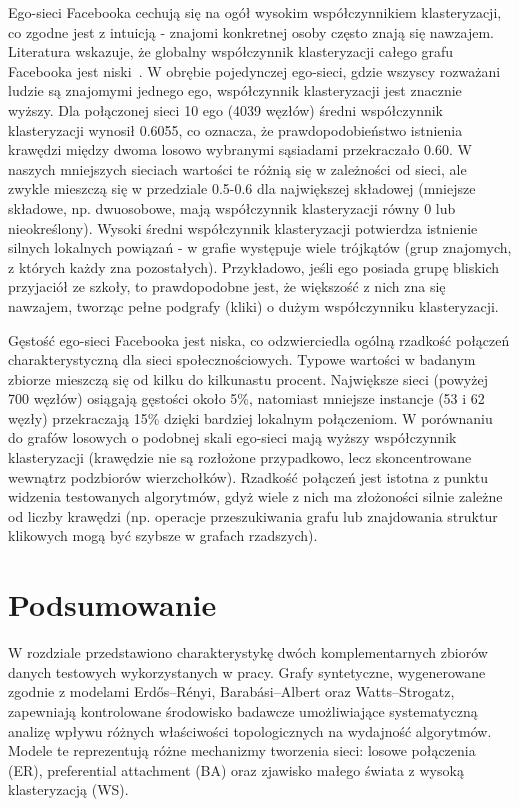 Ego-sieci Facebooka cechują się na ogół wysokim współczynnikiem klasteryzacji, co zgodne jest z intuicją - znajomi konkretnej osoby często znają się nawzajem. Literatura wskazuje, że globalny współczynnik klasteryzacji całego grafu Facebooka jest niski~\cite{Ugander2011}. W obrębie pojedynczej ego-sieci, gdzie wszyscy rozważani ludzie są znajomymi jednego ego, współczynnik klasteryzacji jest znacznie wyższy. Dla połączonej sieci 10 ego (4039 węzłów) średni współczynnik klasteryzacji wynosił 0.6055, co oznacza, że prawdopodobieństwo istnienia krawędzi między dwoma losowo wybranymi sąsiadami przekraczało 0.60. W naszych mniejszych sieciach wartości te różnią się w zależności od sieci, ale zwykle mieszczą się w przedziale 0.5-0.6 dla największej składowej (mniejsze składowe, np. dwuosobowe, mają współczynnik klasteryzacji równy 0 lub nieokreślony). Wysoki średni współczynnik klasteryzacji potwierdza istnienie silnych lokalnych powiązań - w grafie występuje wiele trójkątów (grup znajomych, z których każdy zna pozostałych). Przykładowo, jeśli ego posiada grupę bliskich przyjaciół ze szkoły, to prawdopodobne jest, że większość z nich zna się nawzajem, tworząc pełne podgrafy (kliki) o dużym współczynniku klasteryzacji.

Gęstość ego-sieci Facebooka jest niska, co odzwierciedla ogólną rzadkość połączeń charakterystyczną dla sieci społecznościowych. Typowe wartości w badanym zbiorze mieszczą się od kilku do kilkunastu procent. Największe sieci (powyżej 700 węzłów) osiągają gęstości około 5\%, natomiast mniejsze instancje (53 i 62 węzły) przekraczają 15\% dzięki bardziej lokalnym połączeniom. W porównaniu do grafów losowych o podobnej skali ego-sieci mają wyższy współczynnik klasteryzacji (krawędzie nie są rozłożone przypadkowo, lecz skoncentrowane wewnątrz podzbiorów wierzchołków). Rzadkość połączeń jest istotna z punktu widzenia testowanych algorytmów, gdyż wiele z nich ma złożoności silnie zależne od liczby krawędzi (np. operacje przeszukiwania grafu lub znajdowania struktur klikowych mogą być szybsze w grafach rzadszych).

\section{Podsumowanie}

W rozdziale przedstawiono charakterystykę dwóch komplementarnych zbiorów danych testowych wykorzystanych w pracy. Grafy syntetyczne, wygenerowane zgodnie z modelami Erdős--Rényi, Barabási--Albert oraz Watts--Strogatz, zapewniają kontrolowane środowisko badawcze umożliwiające systematyczną analizę wpływu różnych właściwości topologicznych na wydajność algorytmów. Modele te reprezentują różne mechanizmy tworzenia sieci: losowe połączenia (ER), preferential attachment (BA) oraz zjawisko małego świata z wysoką klasteryzacją (WS).

